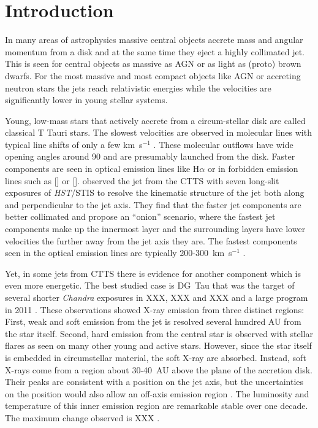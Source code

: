 \section{Introduction} 
In many areas of astrophysics massive central objects accrete mass and angular momentum from a disk and at the same time they eject a highly collimated jet. This is seen for central objects as massive as AGN or as light as (proto) brown dwarfs. For the most massive and most compact objects like AGN or accreting neutron stars the jets reach relativistic energies while the velocities are significantly lower in young stellar systems. 

Young, low-mass stars that actively accrete from a circum-stellar disk are called classical T Tauri stars. The slowest velocities are observed in molecular lines with typical line shifts of only a few km~s$^{-1}$ \citep{2008ApJ...676..472B}. These molecular outflows have wide opening angles around 90\degree{} \citep[e.g.][]{2013A&A...557A.110S} and are presumably launched from the disk. Faster components are seen in optical emission lines like H$\alpha$ or in forbidden emission lines such as [] or []. \citet{2000ApJ...537L..49B} observed the jet from the CTTS  with seven long-slit exposures of \emph{HST}/STIS to resolve the kinematic structure of the jet both along and perpendicular to the jet axis. They find that the faster jet components are better collimated and propose an ``onion'' scenario, where the fastest jet components make up the innermost layer and the surrounding layers have lower velocities the further away from the jet axis they are. The fastest components seen in the optical emission lines are typically 200-300~km~s$^{-1}$ \citep{2004Ap&SS.292..651B,2008ApJ...689.1112C,2013A&A...550L...1S}.

Yet, in some jets from CTTS there is evidence for another component which is even more energetic. The best studied case is DG~Tau that was the target of several shorter \emph{Chandra} exposures in XXX, XXX and XXX and a large program in 2011 \citep{2005ApJ...626L..53G,2008A&A...478..797G,2011ASPC..448..617G}. These observations showed X-ray emission from three distinct regions: First, weak and soft emission from the jet is resolved several hundred AU from the star itself. Second, hard emission from the central star is observed with stellar flares as seen on many other young and active stars. However, since the star itself is embedded in circumstellar material, the soft X-ray are absorbed. Instead, soft X-rays come from a region about 30-40~AU above the plane of the accretion disk. Their peaks are consistent with a position on the jet axis, but the uncertainties on the position would also allow an off-axis emission region \citep{2008A&A...488L..13S}. The luminosity and temperature of this inner emission region are remarkable stable over one decade. The maximum change observed is XXX \citep{SchneiderDGTauXray}.